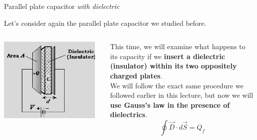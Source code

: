 \begin{frame}{Parallel plate capacitor {\em with dielectric}}

Let's consider again the parallel plate capacitor we studied before.\\

\vspace{0.4cm}

\begin{columns}
  \begin{column}{0.45\textwidth}
   \begin{center}
     \includegraphics[width=0.95\textwidth]{./images/schematics/parallel_plate_capacitor_dielectric.png}\\
   \end{center}
  \end{column}
  \begin{column}{0.55\textwidth}
    This time, we will examine what happens to its capacity if we {\bf insert a dielectric
    (insulator) within its two oppositely charged plates}.\\
    \vspace{0.2cm}
    We will follow the exact same procedure we followed earlier in this lecture,
    but now we will {\bf use Gauss's law in the presence of dielectrics}.\\
    \begin{equation*}
       \oint \vec{D} \cdot d\vec{S} = Q_f
    \end{equation*}
  \end{column}
\end{columns}

\end{frame}

